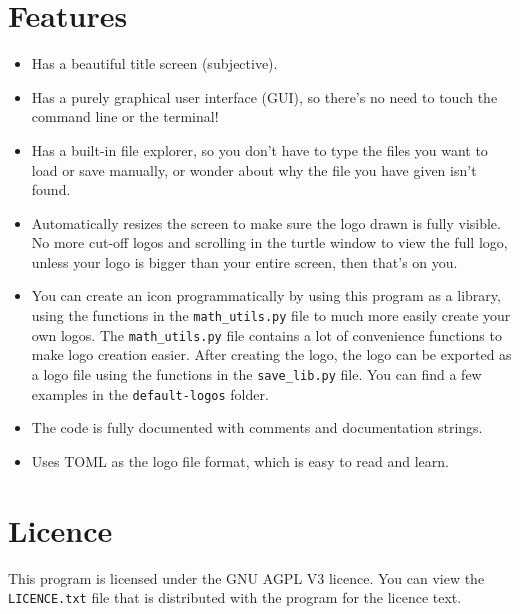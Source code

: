 \documentclass[11pt]{article}
\begin{document}
 \newpage

\section{Features}
\label{sec:org96585bb}
\begin{itemize}
\item Has a beautiful title screen (subjective).
\item Has a purely graphical user interface (GUI), so there's no need to touch the command line or the terminal!
\item Has a built-in file explorer, so you don't have to type the files you want to load or save manually, or wonder about why the file you have given isn't found.
\item Automatically resizes the screen to make sure the logo drawn is fully visible. No more cut-off logos and scrolling in the turtle window to view the full logo, unless your logo is bigger than your entire screen, then that's on you.
\item You can create an icon programmatically by using this program as a library, using the functions in the \texttt{math\_utils.py} file to much more easily create your own logos. The \texttt{math\_utils.py} file contains a lot of convenience functions to make logo creation easier. After creating the logo, the logo can be exported as a logo file using the functions in the \texttt{save\_lib.py} file. You can find a few examples in the \texttt{default-logos} folder.
\item The code is fully documented with comments and documentation strings.
\item Uses TOML as the logo file format, which is easy to read and learn.
\end{itemize}

\section{Licence}
\label{sec:orgc3a5a8f}
This program is licensed under the GNU AGPL V3 licence. You can view the \texttt{LICENCE.txt} file that is distributed with the program for the licence text.
\end{document}
